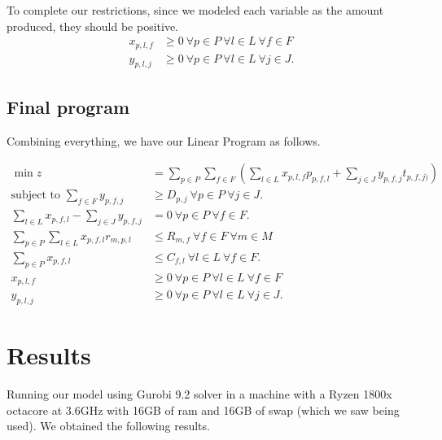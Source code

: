 \documentclass[11pt]{article}
\theoremstyle{definition}
\theoremstyle{definition}
\theoremstyle{remark}
\theoremstyle{remark}
\theoremstyle{remark}
\theoremstyle{remark}
\theoremstyle{definition}
\begin{document}
To complete our restrictions, since we modeled each variable as the amount produced, they should be positive.
\begin{align*}
x_{p,l,f} &\geq 0 \ \forall p \in P \ \forall l \in L \ \forall f \in F \\
y_{p,l,j} &\geq 0 \ \forall p \in P \ \forall l \in L \ \forall j \in J.
\end{align*}
\subsection*{Final program}
\label{sec:org3f67f54}
Combining everything, we have our Linear Program as follows.


\begin{align*}
\min z &= \sum \limits_{p \in P} \sum_{f \in F} (\sum \limits_{l \in L} x_{p,l,f}p_{p,f,l} + \sum_{j \in J} y_{p,f,j}t_{p,f,j)}) \\
\text{subject to } \sum_{f \in F} y_{p,f,j} &\geq D_{p,j} \ \forall p \in P \ \forall j \in J. \\
\sum \limits_{l \in L} x_{p,f,l} - \sum_{j \in J} y_{p,f,j} &= 0 \ \forall p \in P \ \forall f \in F . \\
\sum \limits_{p \in P} \sum \limits_{l \in L} x_{p,f,l}r_{m,p,l} &\leq R_{m,f} \ \forall f \in F \ \forall m \in M \\
\sum_{p \in P} x_{p,f,l} &\leq C_{f,l} \ \forall l \in L \ \forall f \in F. \\
x_{p,l,f} &\geq 0 \ \forall p \in P \ \forall l \in L \ \forall f \in F \\
y_{p,l,j} &\geq 0 \ \forall p \in P \ \forall l \in L \ \forall j \in J.
\end{align*}

\section*{Results}
\label{sec:org6d70f96}

Running our model using Gurobi 9.2 solver in a machine with a Ryzen 1800x octacore at 3.6GHz with 16GB of ram and 16GB of swap (which we saw being used). We obtained the following results.
\end{document}
